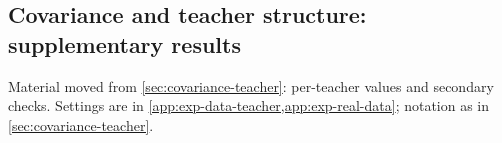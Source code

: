 \subsection{Covariance and teacher structure: supplementary results}\label{app:supp-cov}

Material moved from \cref{sec:covariance-teacher}: per-teacher values and secondary checks. Settings are
in \cref{app:exp-data-teacher,app:exp-real-data}; notation as in \cref{sec:covariance-teacher}.

